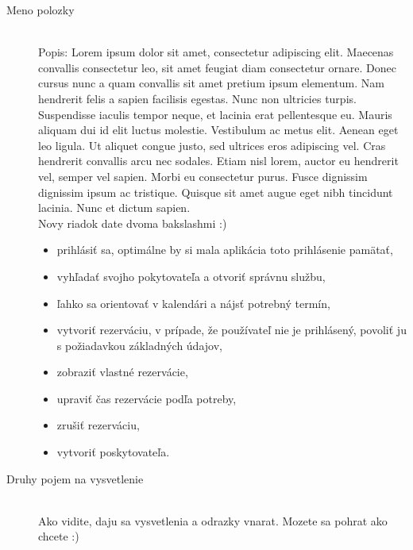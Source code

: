 \begin{description}
	\item[Meno polozky] \hfill \\
Popis:
Lorem ipsum dolor sit amet, consectetur adipiscing elit. Maecenas convallis consectetur leo, sit amet feugiat diam consectetur ornare. 
Donec cursus nunc a quam convallis sit amet pretium ipsum elementum. Nam hendrerit felis a sapien facilisis egestas. 
Nunc non ultricies turpis. Suspendisse iaculis tempor neque, et lacinia erat pellentesque eu. Mauris aliquam dui id elit luctus molestie. 
Vestibulum ac metus elit. Aenean eget leo ligula. Ut aliquet congue justo, sed ultrices eros adipiscing vel. Cras hendrerit convallis arcu nec sodales. 
Etiam nisl lorem, auctor eu hendrerit vel, semper vel sapien. Morbi eu consectetur purus. Fusce dignissim dignissim ipsum ac tristique. 
Quisque sit amet augue eget nibh tincidunt lacinia. Nunc et dictum sapien.
\\Novy riadok date dvoma bakslashmi :)
\begin{itemize}
	\item prihlásiť sa, optimálne by si mala aplikácia toto prihlásenie pamätať,
	\item vyhľadať svojho pokytovateľa a otvoriť správnu službu,
	\item ľahko sa orientovať v kalendári a nájsť potrebný termín,
	\item vytvoriť rezerváciu, v prípade, že používateľ nie je prihlásený, povoliť ju s požiadavkou základných údajov,
	\item zobraziť vlastné rezervácie,
	\item upraviť čas rezervácie podľa potreby,
	\item zrušiť rezerváciu,
	\item vytvoriť poskytovateľa.
\end{itemize}
	\item[Druhy pojem na vysvetlenie] \hfill \\
Ako vidite, daju sa vysvetlenia a odrazky vnarat. Mozete sa pohrat ako chcete :)
\end{description}

